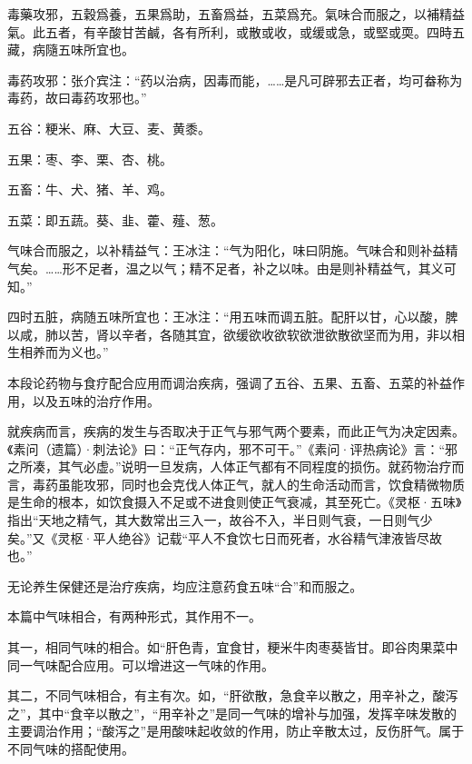 \documentclass[draft,12pt]{ctexbook}
\begin{document}
\begin{yuanwen}
毒藥攻邪，五穀爲養，五果爲助，五畜爲益，五菜爲充。氣味合而服之，以補精益氣。此五者，有辛酸甘苦鹹，各有所利，或散或收，或缓或急，或堅或耎。四時五藏，病隨五味所宜也。
\end{yuanwen}


\begin{jiaozhu}
  \item 毒药攻邪：张介宾注：“药以治病，因毒而能，……是凡可辟邪去正者，均可畚称为毒药，故曰毒药攻邪也。”
  \item 五谷：粳米、麻、大豆、麦、黄黍。
  \item 五果：枣、李、栗、杏、桃。
  \item 五畜：牛、犬、猪、羊、鸡。
  \item 五菜：即五蔬。葵、韭、藿、薤、葱。
  \item 气味合而服之，以补精益气：王冰注：“气为阳化，味曰阴施。气味合和则补益精气矣。……形不足者，温之以气；精不足者，补之以味。由是则补精益气，其义可知。”
  \item 四时五脏，病随五味所宜也：王冰注：“用五味而调五脏。配肝以甘，心以酸，脾以咸，肺以苦，肾以辛者，各随其宜，欲缓欲收欲软欲泄欲散欲坚而为用，非以相生相养而为义也。”
\end{jiaozhu}



本段论药物与食疗配合应用而调治疾病，强调了五谷、五果、五畜、五菜的补益作用，以及五味的治疗作用。

就疾病而言，疾病的发生与否取决于正气与邪气两个要素，而此正气为决定因素。《素问（遗篇）·刺法论》曰：“正气存内，邪不可干。”《素问·评热病论》言：“邪之所凑，其气必虚。”说明一旦发病，人体正气都有不同程度的损伤。就药物治疗而言，毒药虽能攻邪，同时也会克伐人体正气，就人的生命活动而言，饮食精微物质是生命的根本，如饮食摄入不足或不进食则使正气衰减，其至死亡。《灵枢·五味》指出“天地之精气，其大数常出三入一，故谷不入，半日则气衰，一日则气少矣。”又《灵枢·平人绝谷》记载“平人不食饮七日而死者，水谷精气津液皆尽故也。”

无论养生保健还是治疗疾病，均应注意药食五味“合”和而服之。

本篇中气味相合，有两种形式，其作用不一。

其一，相同气味的相合。如“肝色青，宜食甘，粳米牛肉枣葵皆甘。即谷肉果菜中同一气味配合应用。可以增进这一气味的作用。

其二，不同气味相合，有主有次。如，“肝欲散，急食辛以散之，用辛补之，酸泻之”，其中“食辛以散之”，“用辛补之”是同一气味的增补与加强，发挥辛味发散的主要调治作用；“酸泻之”是用酸味起收敛的作用，防止辛散太过，反伤肝气。属于不同气味的搭配使用。
\end{document}
